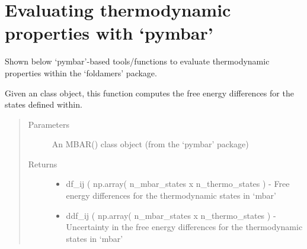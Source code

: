 \documentclass[letterpaper,12pt,english,openany,oneside]{sphinxmanual}
\begin{document}
\newpage


\section{Evaluating thermodynamic properties with ‘pymbar’}
\label{\detokenize{thermo:evaluating-thermodynamic-properties-with-pymbar}}
Shown below ‘pymbar’-based tools/functions to evaluate thermodynamic properties within the ‘foldamers’ package.

\label{\detokenize{thermo:module-parameters.reweight}}

\begin{fulllineitems}
\label{\detokenize{thermo:parameters.reweight.get_free_energy_differences}}
Given an  class object, this function computes the free energy differences for the states defined within.
\begin{quote}\begin{description}
\item[{Parameters}] \leavevmode
{} \textendash{} An MBAR() class object (from the ‘pymbar’ package)

\item[{Returns}] \leavevmode
\begin{itemize}
\item {} 
df\_ij ( np.array( n\_mbar\_states x n\_thermo\_states ) - Free energy differences for the thermodynamic states in ‘mbar’

\item {} 
ddf\_ij ( np.array( n\_mbar\_states x n\_thermo\_states ) - Uncertainty in the free energy differences for the thermodynamic states in ‘mbar’

\end{itemize}


\end{description}\end{quote}

\end{fulllineitems}

\end{document}
